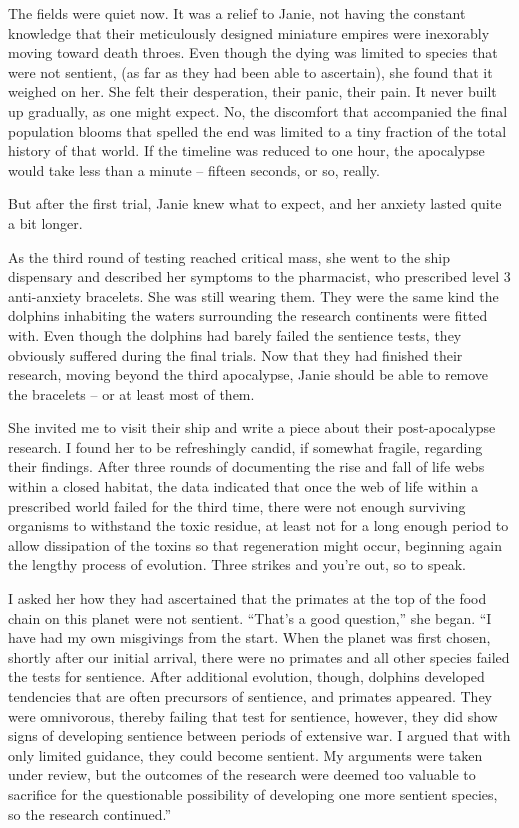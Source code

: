 
The fields were quiet now. It was a relief to Janie, not having the
constant knowledge that their meticulously designed miniature empires
were inexorably moving toward death throes. Even though the dying was
limited to species that were not sentient, (as far as they had been able
to ascertain), she found that it weighed on her. She felt their
desperation, their panic, their pain. It never built up gradually, as
one might expect. No, the discomfort that accompanied the final
population blooms that spelled the end was limited to a tiny fraction of
the total history of that world. If the timeline was reduced to one
hour, the apocalypse would take less than a minute -- fifteen seconds,
or so, really.

But after the first trial, Janie knew what to expect, and her anxiety
lasted quite a bit longer.

As the third round of testing reached critical mass, she went to the
ship dispensary and described her symptoms to the pharmacist, who
prescribed level 3 anti-anxiety bracelets. She was still wearing them.
They were the same kind the dolphins inhabiting the waters surrounding
the research continents were fitted with. Even though the dolphins had
barely failed the sentience tests, they obviously suffered during the
final trials. Now that they had finished their research, moving beyond
the third apocalypse, Janie should be able to remove the bracelets -- or
at least most of them.

She invited me to visit their ship and write a piece about their
post-apocalypse research. I found her to be refreshingly candid, if
somewhat fragile, regarding their findings. After three rounds of
documenting the rise and fall of life webs within a closed habitat, the
data indicated that once the web of life within a prescribed world
failed for the third time, there were not enough surviving organisms to
withstand the toxic residue, at least not for a long enough period to
allow dissipation of the toxins so that regeneration might occur,
beginning again the lengthy process of evolution. Three strikes and
you're out, so to speak.

I asked her how they had ascertained that the primates at the top of the
food chain on this planet were not sentient. ``That's a good question,''
she began. ``I have had my own misgivings from the start. When the
planet was first chosen, shortly after our initial arrival, there were
no primates and all other species failed the tests for sentience. After
additional evolution, though, dolphins developed tendencies that are
often precursors of sentience, and primates appeared. They were
omnivorous, thereby failing that test for sentience, however, they did
show signs of developing sentience between periods of extensive war. I
argued that with only limited guidance, they could become sentient. My
arguments were taken under review, but the outcomes of the research were
deemed too valuable to sacrifice for the questionable possibility of
developing one more sentient species, so the research continued.''

